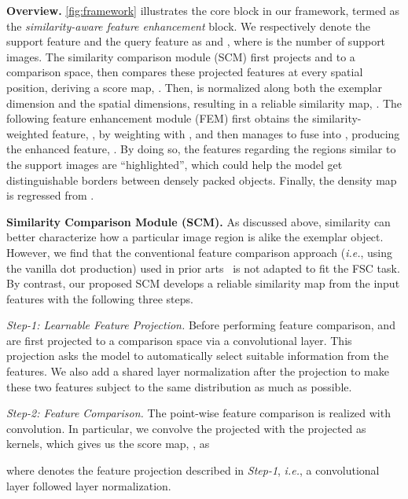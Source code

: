 \documentclass[10pt,twocolumn,letterpaper]{article}
\begin{document}
\vspace{2pt}\noindent\textbf{Overview.}
\cref{fig:framework} illustrates the core block in our framework, termed as the \textit{similarity-aware feature enhancement} block.
We respectively denote the support feature and the query feature as  and , where  is the number of support images. 
The similarity comparison module (SCM) first projects  and  to a comparison space, then compares these projected features at every spatial position, deriving a score map, . 
Then,  is normalized along both the exemplar dimension and the spatial dimensions, resulting in a reliable similarity map, . 
The following feature enhancement module (FEM) first obtains the similarity-weighted feature, , by weighting  with , and then manages to fuse  into , producing the enhanced feature, .
By doing so, the features regarding the regions similar to the support images are ``highlighted'', which could help the model get distinguishable borders between densely packed objects. 
Finally, the density map is regressed from .


\vspace{2pt}\noindent\textbf{Similarity Comparison Module (SCM).}
As discussed above, similarity can better characterize how a particular image region is alike the exemplar object.
However, we find that the conventional feature comparison approach (\textit{i.e.}, using the vanilla dot production) used in prior arts~\cite{cfocnet, famnet} is not adapted to fit the FSC task.
By contrast, our proposed SCM develops a reliable similarity map from the input features with the following three steps.


\textit{Step-1: Learnable Feature Projection.}
Before performing feature comparison,  and  are first projected to a comparison space via a  convolutional layer. 
This projection asks the model to automatically select suitable information from the features.
We also add a shared layer normalization after the projection to make these two features subject to the same distribution as much as possible.



\textit{Step-2: Feature Comparison.}
The point-wise feature comparison is realized with convolution.
In particular, we convolve the projected  with the projected  as kernels, which gives us the score map, , as

where  denotes the feature projection described in \textit{Step-1}, \textit{i.e.}, a  convolutional layer followed layer normalization.
\end{document}
